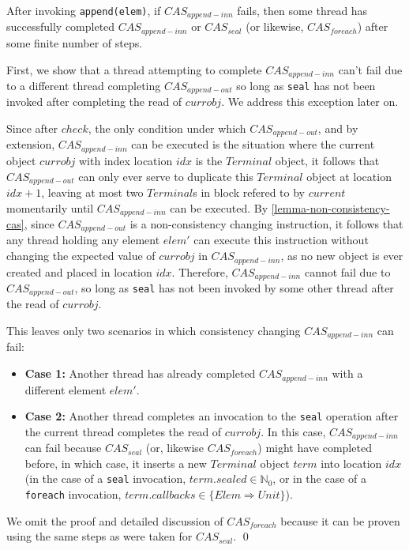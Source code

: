 
\begin{lemmatwo}\label{lemma-cas2} After invoking \verb=append(elem)=, if
$CAS_{append-inn}$ fails, then some thread has successfully completed
$CAS_{append-inn}$ or $CAS_{seal}$ (or likewise, $CAS_{foreach}$) after some
finite number of steps.
\end{lemmatwo}

\begin{prooftwo}
First, we show that a thread attempting to complete $CAS_{append-inn}$ can't fail due to a
different thread completing $CAS_{append-out}$ so long as \verb=seal= has not been invoked
after completing the read of $currobj$. We address this exception later on.

Since after $check$, the only condition under which $CAS_{append-out}$, and by
extension, $CAS_{append-inn}$ can be executed is the situation where the
current object $currobj$ with index location $idx$ is the $Terminal$ object,
it follows that $CAS_{append-out}$ can only ever serve to duplicate this
$Terminal$ object at location $idx+1$, leaving at most two $Terminal$s in
block refered to by $current$ momentarily until $CAS_{append-inn}$ can be
executed. By \ref{lemma-non-consistency-cas}, since $CAS_{append-out}$ is a non-consistency changing
instruction, it follows that any thread holding any element $elem'$ can
execute this instruction without changing the expected value of $currobj$ in
$CAS_{append-inn}$, as no new object is ever created and placed in location
$idx$. Therefore, $CAS_{append-inn}$ cannot fail due to $CAS_{append-out}$, so
long as \verb=seal= has not been invoked by some other thread after the read
of $currobj$.

This leaves only two scenarios in which consistency changing
$CAS_{append-inn}$ can fail:

\begin{itemize}
\item \textbf{Case 1:} Another thread has already completed $CAS_{append-inn}$ with a
different element $elem'$.
\item \textbf{Case 2:} Another thread completes an invocation to the \verb=seal=
operation after the current thread completes the read of $currobj$. In this
case, $CAS_{append-inn}$ can fail because $CAS_{seal}$ (or, likewise $CAS_{foreach}$)
might have completed before, in which case, it inserts a new $Terminal$ object $term$
into location $idx$ (in the case of a \verb=seal= invocation,
$term.sealed\in\mathbb{N}_0$, or in the case of a \verb=foreach= invocation,
$term.callbacks\in\{Elem \Rightarrow Unit\}$).
\end{itemize}

We omit the proof and detailed discussion of $CAS_{foreach}$ because it can be proven
using the same steps as were taken for $CAS_{seal}$.
\qed
\end{prooftwo}

